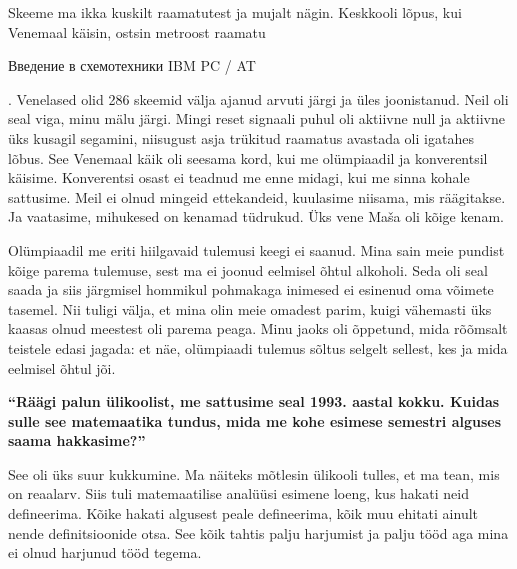 Skeeme ma ikka kuskilt raamatutest ja mujalt nägin. Keskkooli lõpus, kui
Venemaal käisin, ostsin metroost raamatu \begin{russian}Введение в схемотехники
IBM PC / AT\end{russian}. Venelased olid 286 skeemid välja ajanud arvuti järgi ja
üles joonistanud. Neil oli seal viga, minu mälu järgi. Mingi reset signaali
puhul oli aktiivne null ja aktiivne üks kusagil segamini, niisugust asja
trükitud raamatus avastada oli igatahes lõbus. See Venemaal käik oli seesama
kord, kui me olümpiaadil ja konverentsil käisime. Konverentsi osast ei teadnud
me enne midagi, kui me sinna kohale sattusime. Meil ei olnud mingeid
ettekandeid, kuulasime niisama, mis räägitakse. Ja vaatasime, mihukesed on
kenamad tüdrukud. Üks vene Maša oli kõige kenam.

Olümpiaadil me eriti hiilgavaid tulemusi keegi ei saanud. Mina sain meie
pundist kõige parema tulemuse, sest ma ei joonud eelmisel õhtul alkoholi. Seda
oli seal saada ja siis järgmisel hommikul pohmakaga inimesed ei esinenud oma
võimete tasemel. Nii tuligi välja, et mina olin meie omadest parim, kuigi
vähemasti üks kaasas olnud meestest oli parema peaga. Minu jaoks oli õppetund,
mida rõõmsalt teistele edasi jagada: et näe, olümpiaadi tulemus sõltus selgelt
sellest, kes ja mida eelmisel õhtul jõi.

\textbf{\enquote{Räägi palun ülikoolist, me sattusime seal 1993. aastal kokku.
Kuidas sulle see matemaatika tundus, mida me kohe esimese semestri alguses
saama hakkasime?}}

See oli üks suur kukkumine. Ma näiteks mõtlesin ülikooli tulles, et ma tean,
mis on reaalarv. Siis tuli matemaatilise analüüsi esimene loeng, kus hakati
neid defineerima. Kõike hakati algusest peale defineerima, kõik muu ehitati
ainult nende definitsioonide otsa. See kõik tahtis palju harjumist ja palju
tööd aga mina ei olnud harjunud tööd tegema.


